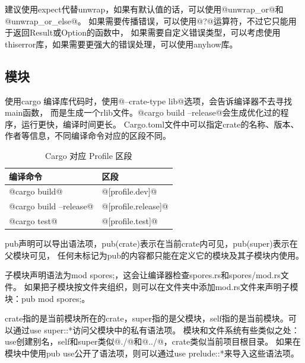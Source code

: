 建议使用expect代替unwrap，如果有默认值的话，可以使用@unwrap_or@和@unwrap_or_else@。
如果需要传播错误，可以使用@?@运算符，不过它只能用于返回Result或Option的函数中，
如果需要自定义错误类型，可以考虑使用thiserror库，如果需要更强大的错误处理，可以使用anyhow库。

\subsection{模块}
使用cargo 编译库代码时，使用@--crate-type lib@选项，会告诉编译器不去寻找main函数，
而是生成一个rlib文件。@cargo build --release@会生成优化过的程序，运行更快，编译时间更长。
Cargo.toml文件中可以指定crate的名称、版本、作者等信息，不同编译命令对应的区段不同。
\begin{table}[ht]
	\centering
	\begin{tabular}{|l|l|}
		\hline
		\textbf{编译命令}                  & \textbf{区段}  \\ \hline
		@cargo build@           & @[profile.dev]@     \\ \hline
		@cargo build --release@ & @[profile.release]@ \\ \hline
		@cargo test@            & @[profile.test]@    \\ \hline
	\end{tabular}
	\caption{Cargo 对应 Profile 区段}
\end{table}

pub声明可以导出语法项，pub(crate)表示在当前crate内可见，pub(super)表示在父模块可见，
任何未标记为pub的内容都只能在定义它的模块及其子模块内使用。

子模块声明语法为mod spores;，这会让编译器检查spores.rs和spores/mod.rs文件。
如果把子模块按文件夹组织，则可以在文件夹中添加mod.rs文件来声明子模块：pub mod spores;。

crate指的是当前模块所在的crate，super指的是父模块，self指的是当前模块。可以通过use super::*访问父模块中的私有语法项。
模块和文件系统有些类似之处：use创建别名，self和super类似@./@和@../@，crate类似当前项目根目录。
如果在模块中使用pub use公开了语法项，则可以通过use prelude::*来导入这些语法项。
